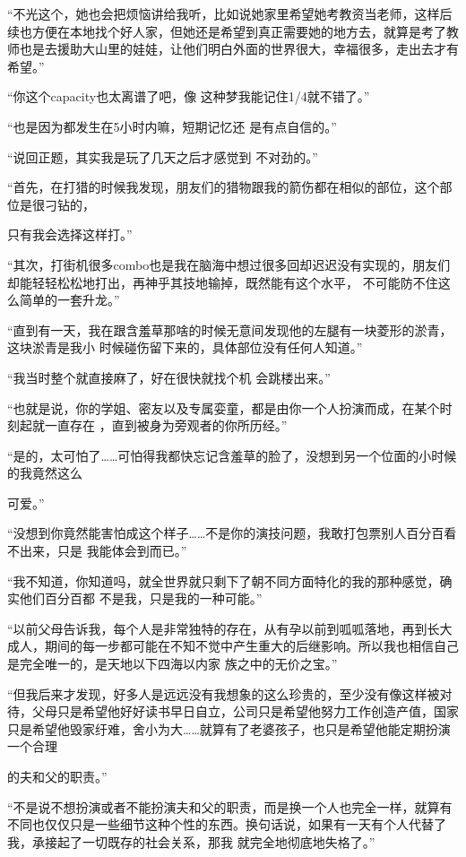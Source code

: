\documentclass{article}
\begin{document}
“不光这个，她也会把烦恼讲给我听，比如说她家里希望她考教资当老师，这样后续也方便在本地找个好人家，但她还是希望到真正需要她的地方去，就算是考了教师也是去援助大山里的娃娃，让他们明白外面的世界很大，幸福很多，走出去才有希望。”

“你这个capacity也太离谱了吧，像
这种梦我能记住1/4就不错了。” 

“也是因为都发生在5小时内嘛，短期记忆还
是有点自信的。” 

“说回正题，其实我是玩了几天之后才感觉到
不对劲的。” 

“首先，在打猎的时候我发现，朋友们的猎物跟我的箭伤都在相似的部位，这个部位是很刁钻的，
\newpage

只有我会选择这样打。” 

“其次，打街机很多combo也是我在脑海中想过很多回却迟迟没有实现的，朋友们却能轻轻松松地打出，再神乎其技地输掉，既然能有这个水平，
不可能防不住这么简单的一套升龙。” 

“直到有一天，我在跟含羞草那啥的时候无意间发现他的左腿有一块菱形的淤青，这块淤青是我小
时候碰伤留下来的，具体部位没有任何人知道。” 

“我当时整个就直接麻了，好在很快就找个机
会跳楼出来。” 

“也就是说，你的学姐、密友以及专属娈童，都是由你一个人扮演而成，在某个时刻起就一直存在
，直到被身为旁观者的你所历经。” 

“是的，太可怕了……可怕得我都快忘记含羞草的脸了，没想到另一个位面的小时候的我竟然这么

\newpage
可爱。” 

“没想到你竟然能害怕成这个样子……不是你的演技问题，我敢打包票别人百分百看不出来，只是
我能体会到而已。” 

“我不知道，你知道吗，就全世界就只剩下了朝不同方面特化的我的那种感觉，确实他们百分百都
不是我，只是我的一种可能。” 

“以前父母告诉我，每个人是非常独特的存在，从有孕以前到呱呱落地，再到长大成人，期间的每一步都可能在不知不觉中产生重大的后继影响。所以我也相信自己是完全唯一的，是天地以下四海以内家
族之中的无价之宝。” 

“但我后来才发现，好多人是远远没有我想象的这么珍贵的，至少没有像这样被对待，父母只是希望他好好读书早日自立，公司只是希望他努力工作创造产值，国家只是希望他毁家纡难，舍小为大……就算有了老婆孩子，也只是希望他能定期扮演一个合理

\newpage
的夫和父的职责。” 

“不是说不想扮演或者不能扮演夫和父的职责，而是换一个人也完全一样，就算有不同也仅仅只是一些细节这种个性的东西。换句话说，如果有一天有个人代替了我，承接起了一切既存的社会关系，那我
就完全地彻底地失格了。” 
\end{document}
